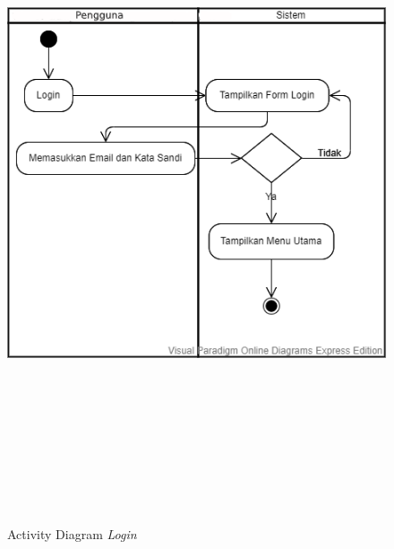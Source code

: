 \documentclass{scrreprt}
\begin{document}
	
		\begin{figure}
			\includegraphics[width=15cm, height=20cm]{Activity-diagram-login.png}
			\caption{Activity Diagram \emph{Login}}
		\end{figure}
	
\end{document}

